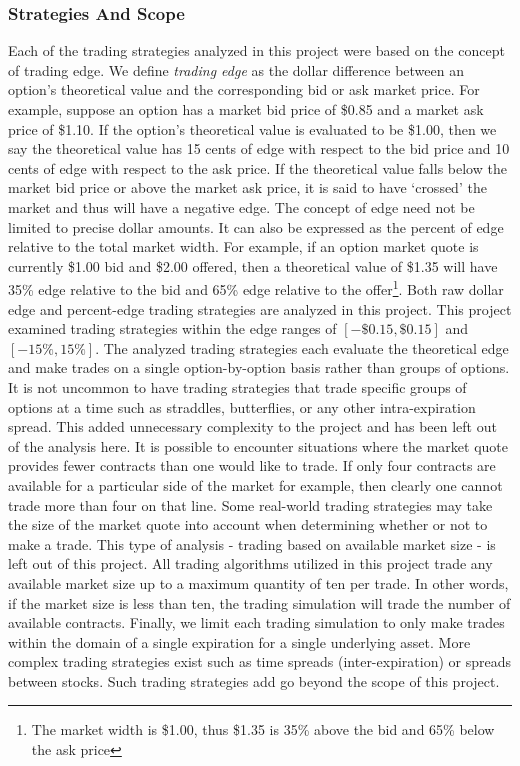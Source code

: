 \documentclass[12pt, a4paper, notitlepage]{article}
\numberwithin{equation}{subsection}
\numberwithin{figure}{subsection}
\numberwithin{table}{subsection}
\newcommand{\newpar}{\newline \newline}
\begin{document}
\subsubsection{Strategies And Scope}
\label{subsec:TradingStrategiesAndScope}
Each of the trading strategies analyzed in this project were based on the concept of trading edge.  We define \textit{trading edge} as the dollar difference between an option's theoretical value and the corresponding bid or ask market price.  For example, suppose an option has a market bid price of \$0.85 and a market ask price of \$1.10.  If the option's theoretical value is evaluated to be \$1.00, then we say the theoretical value has 15 cents of edge with respect to the bid price and 10 cents of edge with respect to the ask price.  If the theoretical value falls below the market bid price or above the market ask price, it is said to have `crossed' the market and thus will have a negative edge.
\newpar
The concept of edge need not be limited to precise dollar amounts.  It can also be expressed as the percent of edge relative to the total market width.  For example, if an option market quote is currently \$1.00 bid and \$2.00 offered, then a theoretical value of \$1.35 will have 35\% edge relative to the bid and 65\% edge relative to the offer\footnote{The market width is \$1.00, thus \$1.35 is 35\% above the bid and 65\% below the ask price}.  Both raw dollar edge and percent-edge trading strategies are analyzed in this project.  This project examined trading strategies within the edge ranges of $[-\$0.15, \$0.15]$ and $[-15\%, 15\%]$.
\newpar
The analyzed trading strategies each evaluate the theoretical edge and make trades on a single option-by-option basis rather than groups of options.  It is not uncommon to have trading strategies that trade specific groups of options at a time such as straddles, butterflies, or any other intra-expiration spread.  This added unnecessary complexity to the project and has been left out of the analysis here.
\newpar
It is possible to encounter situations where the market quote provides fewer contracts than one would like to trade.  If only four contracts are available for a particular side of the market for example, then clearly one cannot trade more than four on that line.  Some real-world trading strategies may take the size of the market quote into account when determining whether or not to make a trade.  This type of analysis - trading based on available market size - is left out of this project.  All trading algorithms utilized in this project trade any available market size up to a maximum quantity of ten per trade.  In other words, if the market size is less than ten, the trading simulation will trade the number of available contracts.
\newpar
Finally, we limit each trading simulation to only make trades within the domain of a single expiration for a single underlying asset.  More complex trading strategies exist such as time spreads (inter-expiration) or spreads between stocks.  Such trading strategies add go beyond the scope of this project.
\end{document}
